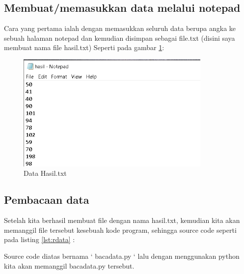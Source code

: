 \subsection{Membuat/memasukkan data melalui notepad}
Cara yang pertama ialah dengan memasukkan seluruh data berupa angka ke sebuah halaman notepad dan kemudian disimpan sebagai file.txt (disini saya membuat nama file hasil.txt)
Seperti pada gambar \ref{fig:hasiltxt}:
\begin{figure}[!htbp]
	\centerline{\includegraphics[width=0.85\textwidth]{figures/6/hasiltxt.PNG}}
	\caption{Data Hasil.txt}
	\label{fig:hasiltxt}
\end{figure}

\subsection{Pembacaan data}
Setelah kita berhasil membuat file dengan nama hasil.txt, kemudian kita akan memanggil file tersebut kesebuah kode program, sehingga source code seperti pada listing \ref{lst:rdata} : 


Source code diatas bernama ‘ bacadata.py ‘ lalu dengan menggunakan python kita akan memanggil bacadata.py tersebut. 

